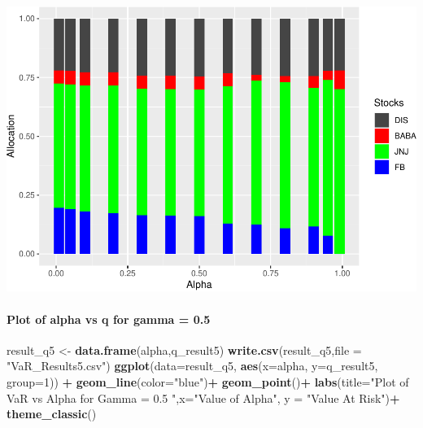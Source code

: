 \documentclass[]{article}
\newenvironment{Shaded}{\begin{snugshade}}{\end{snugshade}}
\newcommand{\KeywordTok}[1]{\textcolor[rgb]{0.13,0.29,0.53}{\textbf{#1}}}
\newcommand{\DataTypeTok}[1]{\textcolor[rgb]{0.13,0.29,0.53}{#1}}
\newcommand{\DecValTok}[1]{\textcolor[rgb]{0.00,0.00,0.81}{#1}}
\newcommand{\StringTok}[1]{\textcolor[rgb]{0.31,0.60,0.02}{#1}}
\newcommand{\OperatorTok}[1]{\textcolor[rgb]{0.81,0.36,0.00}{\textbf{#1}}}
\newcommand{\NormalTok}[1]{#1}
\let\oldparagraph\paragraph
\renewcommand{\paragraph}[1]{\oldparagraph{#1}\mbox{}}
\begin{document}
\includegraphics{Integrated_Management_Formulation_Model_files/figure-latex/unnamed-chunk-15-2.pdf}

\paragraph{Plot of alpha vs q for gamma =
0.5}\label{plot-of-alpha-vs-q-for-gamma-0.5}

\begin{Shaded}
\begin{Highlighting}[]
\NormalTok{result_q5 <-}\StringTok{ }\KeywordTok{data.frame}\NormalTok{(alpha,q_result5)}
\KeywordTok{write.csv}\NormalTok{(result_q5,}\DataTypeTok{file =} \StringTok{"VaR_Results5.csv"}\NormalTok{)}
\KeywordTok{ggplot}\NormalTok{(}\DataTypeTok{data=}\NormalTok{result_q5, }\KeywordTok{aes}\NormalTok{(}\DataTypeTok{x=}\NormalTok{alpha, }\DataTypeTok{y=}\NormalTok{q_result5, }\DataTypeTok{group=}\DecValTok{1}\NormalTok{)) }\OperatorTok{+}
\StringTok{  }\KeywordTok{geom_line}\NormalTok{(}\DataTypeTok{color=}\StringTok{"blue"}\NormalTok{)}\OperatorTok{+}
\StringTok{  }\KeywordTok{geom_point}\NormalTok{()}\OperatorTok{+}
\StringTok{  }\KeywordTok{labs}\NormalTok{(}\DataTypeTok{title=}\StringTok{"Plot of VaR vs Alpha for Gamma = 0.5 "}\NormalTok{,}\DataTypeTok{x=}\StringTok{"Value of Alpha"}\NormalTok{, }\DataTypeTok{y =} \StringTok{"Value At Risk"}\NormalTok{)}\OperatorTok{+}
\StringTok{  }\KeywordTok{theme_classic}\NormalTok{()}
\end{Highlighting}
\end{Shaded}
\end{document}

